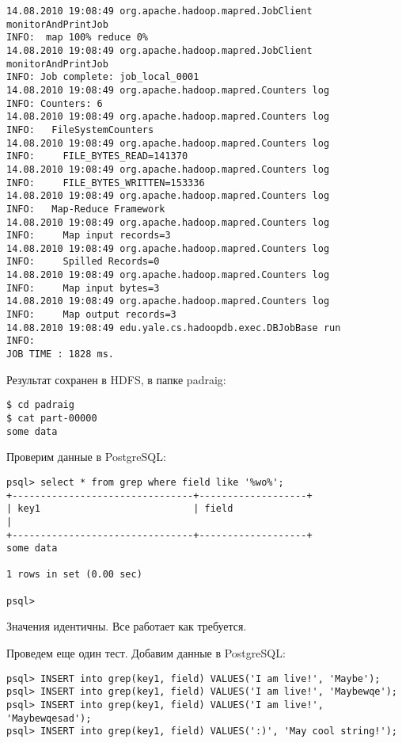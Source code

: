 \begin{lstlisting}[label=lst:haddop25,caption=Тестирование]
14.08.2010 19:08:49 org.apache.hadoop.mapred.JobClient monitorAndPrintJob
INFO:  map 100% reduce 0%
14.08.2010 19:08:49 org.apache.hadoop.mapred.JobClient monitorAndPrintJob
INFO: Job complete: job_local_0001
14.08.2010 19:08:49 org.apache.hadoop.mapred.Counters log
INFO: Counters: 6
14.08.2010 19:08:49 org.apache.hadoop.mapred.Counters log
INFO:   FileSystemCounters
14.08.2010 19:08:49 org.apache.hadoop.mapred.Counters log
INFO:     FILE_BYTES_READ=141370
14.08.2010 19:08:49 org.apache.hadoop.mapred.Counters log
INFO:     FILE_BYTES_WRITTEN=153336
14.08.2010 19:08:49 org.apache.hadoop.mapred.Counters log
INFO:   Map-Reduce Framework
14.08.2010 19:08:49 org.apache.hadoop.mapred.Counters log
INFO:     Map input records=3
14.08.2010 19:08:49 org.apache.hadoop.mapred.Counters log
INFO:     Spilled Records=0
14.08.2010 19:08:49 org.apache.hadoop.mapred.Counters log
INFO:     Map input bytes=3
14.08.2010 19:08:49 org.apache.hadoop.mapred.Counters log
INFO:     Map output records=3
14.08.2010 19:08:49 edu.yale.cs.hadoopdb.exec.DBJobBase run
INFO:
JOB TIME : 1828 ms.
\end{lstlisting}

Результат сохранен в HDFS, в папке padraig:

\begin{lstlisting}[label=lst:haddop26,caption=Тестирование]
$ cd padraig
$ cat part-00000
some data
\end{lstlisting}

Проверим данные в PostgreSQL:

\begin{lstlisting}[label=lst:haddop27,caption=Тестирование]
psql> select * from grep where field like '%wo%';
+--------------------------------+-------------------+
| key1                           | field
|
+--------------------------------+-------------------+
some data

1 rows in set (0.00 sec)

psql>
\end{lstlisting}

Значения идентичны. Все работает как требуется.

Проведем еще один тест. Добавим данные в PostgreSQL:

\begin{lstlisting}[label=lst:haddop27:1,caption=Тестирование]
psql> INSERT into grep(key1, field) VALUES('I am live!', 'Maybe');
psql> INSERT into grep(key1, field) VALUES('I am live!', 'Maybewqe');
psql> INSERT into grep(key1, field) VALUES('I am live!', 'Maybewqesad');
psql> INSERT into grep(key1, field) VALUES(':)', 'May cool string!');
\end{lstlisting}


